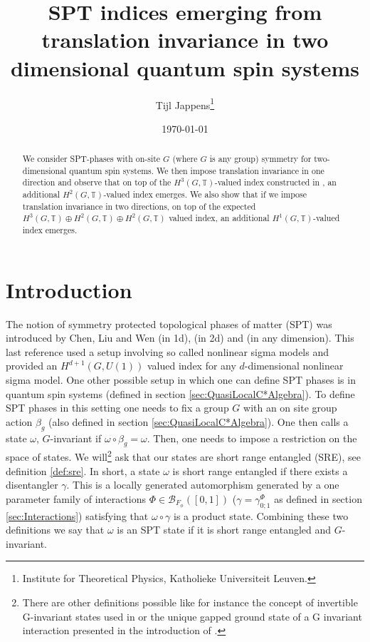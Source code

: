 \documentclass[12pt,a4paper,twoside]{article}
\title{SPT indices emerging from translation invariance in two dimensional quantum spin systems}
\author{Tijl Jappens\footnote{Institute for Theoretical Physics, Katholieke Universiteit Leuven.}}
\date{\today}
\newcommand{\BB}{\mathcal B}
\newcommand{\TT}{\mathbb T}
\theoremstyle{definition}
\numberwithin{equation}{section}
\begin{document}
\maketitle 
\begin{abstract}
	We consider SPT-phases with on-site $G$ (where $G$ is any group) symmetry for two-dimensional quantum spin systems. We then impose translation invariance in one direction and observe that on top of the $H^3(G,\TT)$-valued index constructed in \cite{ogata2021h3gmathbb}, an additional $H^2(G,\TT)$-valued index emerges. We also show that if we impose translation invariance in two directions, on top of the expected $H^3(G,\TT)\oplus H^2(G,\TT)\oplus H^2(G,\TT)$ valued index, an additional $H^1(G,\TT)$-valued index emerges.
\end{abstract}
\section{Introduction}
The notion of symmetry protected topological phases of matter (SPT) was introduced by Chen, Liu and Wen \cite{Chen_2011} (in 1d), \cite{chen_gu_wen_2011} (in 2d) and \cite{Chen_2013} (in any dimension). This last reference used a setup involving so called nonlinear sigma models and provided an $H^{d+1}(G,U(1))$ valued index for any $d$-dimensional nonlinear sigma model. One other possible setup in which one can define SPT phases is in quantum spin systems (defined in section \ref{sec:QuasiLocalC*Algebra}). To define SPT phases in this setting one needs to fix a group $G$ with an on site group action $\beta_g$ (also defined in section \ref{sec:QuasiLocalC*Algebra}). One then calls a state $\omega$, $G$-invariant if $\omega\circ\beta_g=\omega$. Then, one needs to impose a restriction on the space of states. We will\footnote{There are other definitions possible like for instance the concept of invertible G-invariant states used in \cite{kapustin2021classification} or the unique gapped ground state of a G invariant interaction presented in the introduction of \cite{ogata2021h3gmathbb}.} ask that our states are short range entangled (SRE), see definition \ref{def:sre}. In short, a state $\omega$ is short range entangled if there exists a disentangler $\gamma$. This is a locally generated automorphism generated by a one parameter family of interactions $\Phi\in\BB_{F_\phi}([0,1])$ ($\gamma=\gamma_{0;1}^\Phi$ as defined in section \ref{sec:Interactions}) satisfying that $\omega\circ\gamma$ is a product state. Combining these two definitions we say that $\omega$ is an SPT state if it is short range entangled and $G$-invariant.
\end{document}
